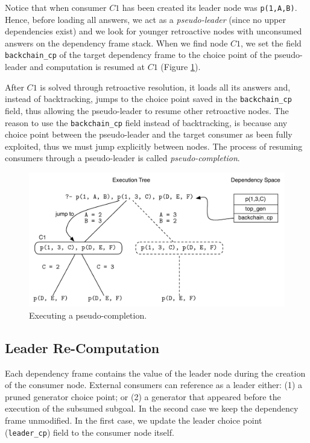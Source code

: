Notice that when consumer $C1$ has been created its leader node was
\texttt{p(1,A,B)}. Hence, before loading all answers, we act as a \textit{pseudo-leader} (since no upper
dependencies exist) and we look for younger retroactive nodes with unconsumed answers on the dependency
frame stack. When we find node $C1$, we set the field \texttt{backchain\_cp} of the target dependency
frame to the choice point of the pseudo-leader and computation is resumed at $C1$
(Figure \ref{fig:retro_pseudo_completion2}).

After $C1$ is solved
through retroactive resolution, it loads all its answers and, instead of backtracking, jumps to the choice
point saved in the \texttt{backchain\_cp} field, thus allowing the pseudo-leader to resume other retroactive
nodes. The reason to use the \texttt{backchain\_cp} field instead of backtracking, is because any choice
point between the pseudo-leader and the target consumer as been fully exploited, thus we must jump explicitly
between nodes. The process of resuming consumers through a pseudo-leader is called \textit{pseudo-completion}.

\begin{figure}[ht]
  \centering
    \includegraphics[scale=0.6]{retro_pseudo_completion2.pdf}
  \caption{Executing a pseudo-completion.}
  \label{fig:retro_pseudo_completion2}
\end{figure}

\subsection{Leader Re-Computation}

Each dependency frame contains the value of the leader node during the creation of the consumer node.
External consumers can reference as a leader either: (1) a pruned generator choice point; or (2) a
generator that appeared before the execution of the subsumed subgoal. In the second case we keep
the dependency frame unmodified. In the first case, we update the leader choice point (\texttt{leader\_cp})
field to the consumer node itself.

